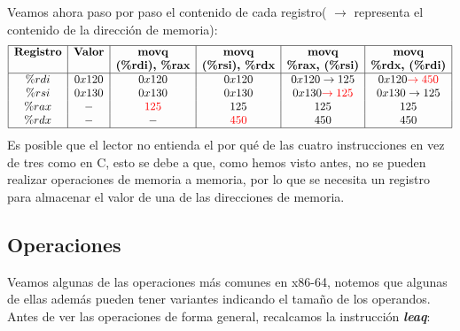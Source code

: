 \begin{ejemplo}
	Veamos ahora paso por paso el contenido de cada registro( $\rightarrow$ representa el contenido de la dirección de memoria):
	\[
		\begin{array}{|c|c|c|c|c|c|}
			\hline
			\textbf{Registro} & \textbf{Valor} & \textbf{movq}           & \textbf{movq}           & \textbf{movq}                                 & \textbf{movq}                         \\
			                  &                & \textbf{(\%rdi), \%rax} & \textbf{(\%rsi), \%rdx} & \textbf{\%rax, (\%rsi)}                       & \textbf{\%rdx, (\%rdi)}               \\
			\hline
			\%rdi             & 0x120          & 0x120                   & 0x120                   & 0x120                         \rightarrow 125 & 0x120 \textcolor{red}{\rightarrow450} \\
			\%rsi             & 0x130          & 0x130                   & 0x130                   & 0x130\textcolor{red}{\rightarrow125}          & 0x130 \rightarrow 125                 \\
			\%rax             & -              & \textcolor{red}{125}    & 125                     & 125                                           & 125                                   \\
			\%rdx             & -              & -                       & \textcolor{red}{450}    & 450                                           & 450                                   \\
			\hline
		\end{array}
	\]
	Es posible que el lector no entienda el por qué de las cuatro instrucciones en vez de tres como en C, esto se debe a que, como hemos visto antes, no se pueden realizar
	operaciones de memoria a memoria, por lo que se necesita un registro para almacenar el valor de una de las direcciones de memoria.
\end{ejemplo}
\subsection{Operaciones}
Veamos algunas de las operaciones más comunes en x86-64, notemos que algunas de ellas además pueden tener
variantes indicando el tamaño de los operandos. Antes de ver las operaciones de forma general, recalcamos
la instrucción \textbf{\textit{leaq}}:

